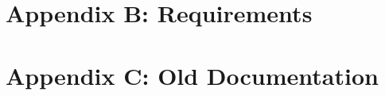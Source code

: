 \documentclass[a4paper,12pt,twoside]{scrreprt}
\begin{document}
\chapter*{Appendix B: Requirements}  %
\label{chap:AppendixBRequirements}


\chapter*{Appendix C: Old Documentation}  %
\label{chap:AppendixCOldDocumentation}

\end{document}
